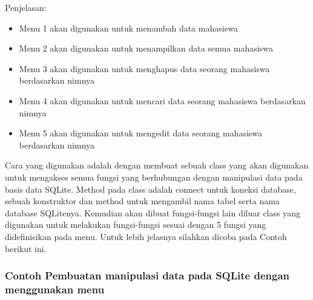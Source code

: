Penjelasan:

\begin{itemize}

\item
  Menu 1 akan digunakan untuk menambah data mahasiswa
\item
  Menu 2 akan digunakan untuk menampilkan data semua mahasiswa
\item
  Menu 3 akan digunakan untuk menghapus data seorang mahasiswa
  berdasarkan nimnya
\item
  Menu 4 akan digunakan untuk mencari data seorang mahasiswa berdasarkan
  nimnya
\item
  Menu 5 akan digunakan untuk mengedit data seorang mahasiswa
  berdasarkan nimnya
\end{itemize}

Cara yang digunakan adalah dengan membuat sebuah class yang akan
digunakan untuk mengakses semua fungsi yang berhubungan dengan
manipulasi data pada basis data SQLite. Method pada class adalah connect
untuk koneksi database, sebuah konstruktor dan method untuk mengambil
nama tabel serta nama database SQLitenya. Kemudian akan dibuat
fungsi-fungsi lain diluar class yang digunakan untuk melakukan
fungsi-fungsi sesuai dengan 5 fungsi yang didefinisikan pada menu. Untuk
lebih jelasnya silahkan dicoba pada Contoh berikut ini.

\subsubsection*{Contoh  Pembuatan manipulasi data pada SQLite dengan menggunakan menu}

